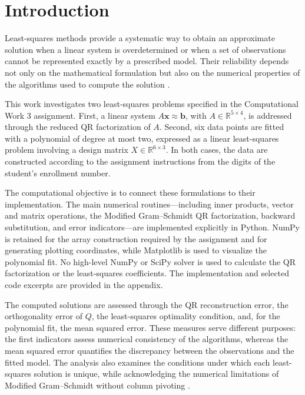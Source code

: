 \section{Introduction}
\label{sec:introduction}

Least-squares methods provide a systematic way to obtain an approximate
solution when a linear system is overdetermined or when a set of
observations cannot be represented exactly by a prescribed model. Their
reliability depends not only on the mathematical formulation but also on the
numerical properties of the algorithms used to compute the solution
\cite{golub2013matrix,trefethen1997numerical}.

This work investigates two least-squares problems specified in the
Computational Work 3 assignment. First, a linear system
$A\mathbf{x}\approx\mathbf{b}$, with $A\in\mathbb{R}^{5\times4}$, is addressed
through the reduced QR factorization of $A$. Second, six data points are
fitted with a polynomial of degree at most two, expressed as a linear
least-squares problem involving a design matrix $X\in\mathbb{R}^{6\times3}$.
In both cases, the data are constructed according to the assignment
instructions from the digits of the student's enrollment number.

The computational objective is to connect these formulations to their
implementation. The main numerical routines—including inner products,
vector and matrix operations, the Modified Gram--Schmidt QR factorization,
backward substitution, and error indicators—are implemented explicitly in
Python. NumPy is retained for the array construction required by the
assignment and for generating plotting coordinates, while Matplotlib is used
to visualize the polynomial fit. No high-level NumPy or SciPy solver is used
to calculate the QR factorization or the least-squares coefficients. The
implementation and selected code excerpts are provided in the appendix.

The computed solutions are assessed through the QR reconstruction error, the
orthogonality error of $Q$, the least-squares optimality condition, and, for
the polynomial fit, the mean squared error. These measures serve different
purposes: the first indicators assess numerical consistency of the
algorithms, whereas the mean squared error quantifies the discrepancy between
the observations and the fitted model. The analysis also examines the
conditions under which each least-squares solution is unique, while
acknowledging the numerical limitations of Modified Gram--Schmidt without
column pivoting \cite{higham2002accuracy}.
